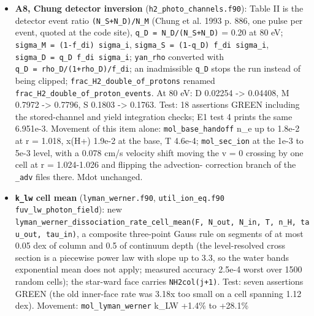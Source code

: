 \documentclass[english,a4paper]{my_memo}
\begin{document}
\begin{itemize}
  (14 assertions; before the change the proton row\textquotesingle s diagonal derivative was
  exactly zero at H+ = 0 and 1e-12 n\_H because the step had collapsed to
  1e-300). Movement of this item alone: \texttt{hp\_zero\_seed} up to 7.8e-4 at the
  ionization front, \texttt{hp\_trace\_seed} 2.8e-5, \texttt{hp\_front} round-off,
  \texttt{mol\_carrier} and \texttt{mol\_base\_handoff} byte-identical. Cost of the extra
  residual assembly +1.5\% wall time on \texttt{hp\_zero\_seed}.
\item
  \textbf{A8, Chung detector inversion} (\texttt{h2\_photo\_channels.f90}): Table II is
  the detector event ratio \texttt{(N\_S+N\_D)/N\_M} (Chung et al. 1993 p. 886, one
  pulse per event, quoted at the code site), \texttt{q\_D\ =\ N\_D/(N\_S+N\_D)} = 0.20 at
  80 eV; \texttt{sigma\_M\ =\ (1-f\_di)\ sigma\_i}, \texttt{sigma\_S\ =\ (1-q\_D)\ f\_di\ sigma\_i},
  \texttt{sigma\_D\ =\ q\_D\ f\_di\ sigma\_i}; \texttt{yan\_rho} converted with \texttt{q\_D\ =\ rho\_D/(1+rho\_D)/f\_di}; an inadmissible \texttt{q\_D} stops the run instead of being
  clipped; \texttt{frac\_H2\_double\_of\_protons} renamed
  \texttt{frac\_H2\_double\_of\_proton\_events}. At 80 eV: D 0.02254 -\textgreater{} 0.04408, M
  0.7972 -\textgreater{} 0.7796, S 0.1803 -\textgreater{} 0.1763. Test: 18 assertions GREEN including
  the stored-channel and yield integration checks; E1 test 4 prints the same
  6.951e-3. Movement of this item alone: \texttt{mol\_base\_handoff} n\_e up to 1.8e-2
  at r = 1.018, x(H+) 1.9e-2 at the base, T 4.6e-4; \texttt{mol\_sec\_ion} at the
  1e-3 to 5e-3 level, with a 0.078 cm/s velocity shift moving the v = 0
  crossing by one cell at r = 1.024-1.026 and flipping the advection-
  correction branch of the \texttt{\_adv} files there. Mdot unchanged.
\item
  \textbf{\texttt{k\_lw} cell mean} (\texttt{lyman\_werner.f90},
  \texttt{util\_ion\_eq.f90} \texttt{fuv\_lw\_photon\_field}): new
  \texttt{lyman\_werner\_dissociation\_rate\_cell\_mean(F,\ N\_out,\ N\_in,\ T,\ n\_H,\ tau\_out,\ tau\_in)}, a composite three-point Gauss rule on segments of at most 0.05
  dex of column and 0.5 of continuum depth (the level-resolved cross section
  is a piecewise power law with slope up to 3.3, so the water bands\textquotesingle{}
  exponential mean does not apply; measured accuracy 2.5e-4 worst over 1500
  random cells); the star-ward face carries \texttt{NH2col(j+1)}. Test: seven
  assertions GREEN (the old inner-face rate was 3.18x too small on a cell
  spanning 1.12 dex). Movement: \texttt{mol\_lyman\_werner} k\_LW +1.4\% to +28.1\%

\end{itemize}
\end{document}
